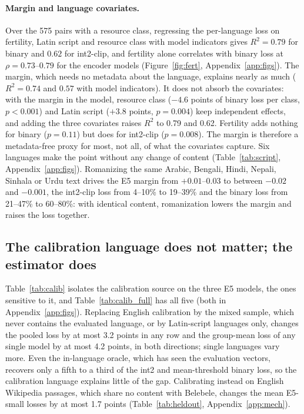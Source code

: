\documentclass[11pt]{article}
\begin{document}
\paragraph{Margin and language covariates.} Over the 575 pairs with a resource class, regressing the per-language loss on fertility, Latin script and resource class with model indicators gives $R^2=0.79$ for binary and $0.62$ for int2-clip, and fertility alone correlates with binary loss at $\rho=0.73$--$0.79$ for the encoder models (Figure~\ref{fig:fert}, Appendix~\ref{app:figs}). The margin, which needs no metadata about the language, explains nearly as much ($R^2=0.74$ and $0.57$ with model indicators). It does not absorb the covariates: with the margin in the model, resource class ($-4.6$ points of binary loss per class, $p<0.001$) and Latin script ($+3.8$ points, $p=0.004$) keep independent effects, and adding the three covariates raises $R^2$ to 0.79 and 0.62. Fertility adds nothing for binary ($p=0.11$) but does for int2-clip ($p=0.008$). The margin is therefore a metadata-free proxy for most, not all, of what the covariates capture.
Six languages make the point without any change of content (Table~\ref{tab:script}, Appendix~\ref{app:figs}). Romanizing the same Arabic, Bengali, Hindi, Nepali, Sinhala or Urdu text drives the E5 margin from $+0.01$--$0.03$ to between $-0.02$ and $-0.001$, the int2-clip loss from 4--10\% to 19--39\% and the binary loss from 21--47\% to 60--80\%: with identical content, romanization lowers the margin and raises the loss together.

\subsection{The calibration language does not matter; the estimator does}\label{sec:calib}
Table~\ref{tab:calib} isolates the calibration source on the three E5 models, the ones sensitive to it, and Table~\ref{tab:calib_full} has all five (both in Appendix~\ref{app:figs}). Replacing English calibration by the mixed sample, which never contains the evaluated language, or by Latin-script languages only, changes the pooled loss by at most 3.2 points in any row and the group-mean loss of any single model by at most 4.2 points, in both directions; single languages vary more. Even the in-language oracle, which has seen the evaluation vectors, recovers only a fifth to a third of the int2 and mean-threshold binary loss, so the calibration language explains little of the gap. Calibrating instead on English Wikipedia passages, which share no content with Belebele, changes the mean E5-small losses by at most 1.7 points (Table~\ref{tab:heldout}, Appendix~\ref{app:mech}).
\end{document}
